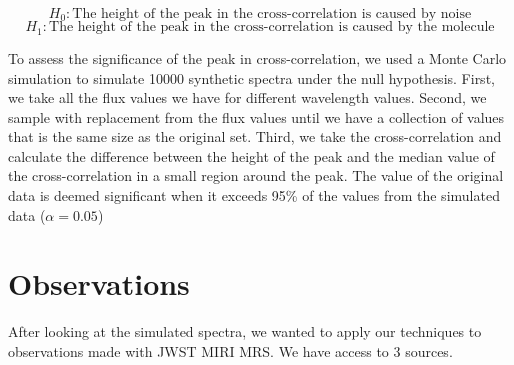 \documentclass[oneside, single, authoryear, semicolon]{lion-msc}
\newcommand{\4}{$_4$}
\newcommand{\3}{$_3$}
\newcommand{\2}{$_2$}
\begin{document}
\begin{equation}
    H_0: \text{The height of the peak in the cross-correlation is caused by noise}
\end{equation}
\begin{equation}
    H_1: \text{The height of the peak in the cross-correlation is caused by the molecule}
\end{equation}

To assess the significance of the peak in cross-correlation, we used a Monte Carlo simulation to simulate 10000 synthetic spectra under the null hypothesis. First, we take all the flux values we have for different wavelength values. Second, we sample with replacement from the flux values until we have a collection of values that is the same size as the original set. Third, we take the cross-correlation and calculate the difference between the height of the peak and the median value of the cross-correlation in a small region around the peak. The value of the original data is deemed significant when it exceeds 95\% of the values from the simulated data ($\alpha=0.05$)


\section{Observations}
After looking at the simulated spectra, we wanted to apply our techniques to observations made with JWST MIRI MRS. We have access to 3 sources. 
\end{document}
